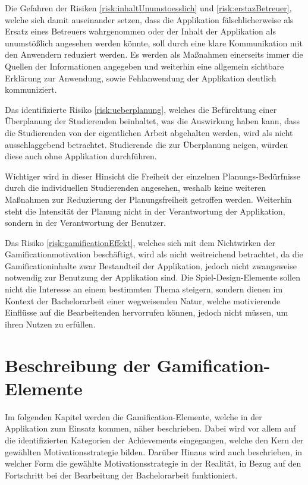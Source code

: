 \documentclass[bibliography=totoc,listof=totoc,BCOR=5mm,DIV=12,oneside]{scrbook}
\begin{document}
\par \medskip Die Gefahren der Risiken \ref{risk:inhaltUnumstoesslich} und \ref{risk:erstazBetreuer}, welche sich damit auseinander setzen, dass die Applikation fälschlicherweise als Ersatz eines Betreuers wahrgenommen oder der Inhalt der Applikation als unumstößlich angesehen werden könnte, soll durch eine klare Kommunikation mit den Anwendern reduziert werden. Es werden als Maßnahmen einerseits immer die Quellen der Informationen angegeben und weiterhin eine allgemein sichtbare Erklärung zur Anwendung, sowie Fehlanwendung der Applikation deutlich kommuniziert.

\par \medskip  Das identifizierte Risiko \ref{risk:ueberplanung}, welches die Befürchtung einer Überplanung der Studierenden beinhaltet, was die Auswirkung haben kann, dass die Studierenden von der eigentlichen Arbeit abgehalten werden, wird als nicht ausschlaggebend betrachtet.
Studierende die zur Überplanung neigen, würden diese auch ohne Applikation durchführen. 
\par Wichtiger wird in dieser Hinsicht die Freiheit der einzelnen Planungs-Bedürfnisse durch die individuellen Studierenden angesehen, weshalb keine weiteren Maßnahmen zur Reduzierung der Planungsfreiheit getroffen werden. Weiterhin steht die Intensität der Planung nicht in der Verantwortung der Applikation, sondern in der Verantwortung der Benutzer. 

\par \medskip Das Risiko \ref{risk:gamificationEffekt}, welches sich mit dem Nichtwirken der Gamificationmotivation beschäftigt, wird als nicht weitreichend betrachtet, da die Gamificationinhalte zwar Bestandteil der Applikation, jedoch nicht zwangsweise notwendig zur Benutzung der Applikation sind. Die Spiel-Design-Elemente sollen nicht die Interesse an einem bestimmten Thema steigern, sondern dienen im Kontext der Bachelorarbeit einer wegweisenden Natur, welche motivierende Einflüsse auf die Bearbeitenden hervorrufen können, jedoch nicht müssen, um ihren Nutzen zu erfüllen. 


\newpage
\section{Beschreibung der Gamification-Elemente} \label{sec:gamificationelemente}
\par Im folgenden Kapitel werden die Gamification-Elemente, welche in der Applikation zum Einsatz kommen, näher beschrieben. Dabei wird vor allem auf die identifizierten Kategorien der Achievements eingegangen, welche den Kern der gewählten Motivationsstrategie bilden. Darüber Hinaus wird auch beschrieben, in welcher Form die gewählte Motivationsstrategie in der Realität, in Bezug auf den Fortschritt bei der Bearbeitung der Bachelorarbeit funktioniert.
\end{document}
